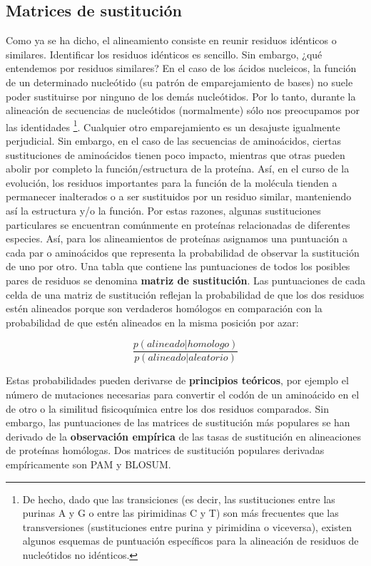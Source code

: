 \subsection{Matrices de sustitución}
Como ya se ha dicho, el alineamiento consiste en reunir residuos idénticos o similares. Identificar los residuos idénticos es sencillo. Sin embargo, ¿qué entendemos por residuos similares? En el caso de los ácidos nucleicos, la función de un determinado nucleótido (su patrón de emparejamiento de bases) no suele poder sustituirse por ninguno de los demás nucleótidos. Por lo tanto, durante la alineación de secuencias de nucleótidos (normalmente) sólo nos preocupamos por las identidades \footnote{De hecho, dado que las transiciones (es decir, las sustituciones entre las purinas A y G o entre las pirimidinas C y T) son más frecuentes que las transversiones (sustituciones entre purina y pirimidina o viceversa), existen algunos esquemas de puntuación específicos para la alineación de residuos de nucleótidos no idénticos.}. Cualquier otro emparejamiento es un desajuste igualmente perjudicial. Sin embargo, en el caso de las secuencias de aminoácidos, ciertas sustituciones de aminoácidos tienen poco impacto, mientras que otras pueden abolir por completo la función/estructura de la proteína. Así, en el curso de la evolución, los residuos importantes para la función de la molécula tienden a permanecer inalterados o a ser sustituidos por un residuo similar, manteniendo así la estructura y/o la función. Por estas razones, algunas sustituciones particulares se encuentran comúnmente en proteínas relacionadas de diferentes especies. Así, para los alineamientos de proteínas asignamos una puntuación a cada par o aminoácidos que representa la probabilidad de observar la sustitución de uno por otro. Una tabla que contiene las puntuaciones de todos los posibles pares de residuos se denomina \textbf{matriz de sustitución}. Las puntuaciones de cada celda de una matriz de sustitución reflejan la probabilidad de que los dos residuos estén alineados porque son verdaderos homólogos en comparación con la probabilidad de que estén alineados en la misma posición por azar:

$$\frac{p(alineado|homologo)}{p(alineado|aleatorio)}$$

Estas probabilidades pueden derivarse de \textbf{principios teóricos}, por ejemplo el número de mutaciones necesarias para convertir el codón de un aminoácido en el de otro o la similitud fisicoquímica entre los dos residuos comparados. Sin embargo, las puntuaciones de las matrices de sustitución más populares se han derivado de la \textbf{observación empírica} de las tasas de sustitución en alineaciones de proteínas homólogas. Dos matrices de sustitución populares derivadas empíricamente son PAM y BLOSUM.

